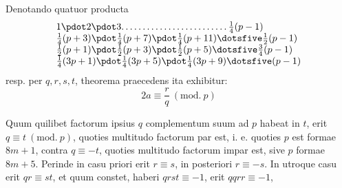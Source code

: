 Denotando quatuor producta
\[
\begin{array}{l}
1\pdot2\pdot3\mathpunct{.\,.\,.\,.\,.\,.\,.\,.\,.\,.\,.\,.\,.\,.\,.\,.\,.\,.\,.\,.\,.\,.\,.\,.\,.}\frac14(p-1)\\
\frac14(p+3)\pdot\frac14(p+7)\pdot\frac14(p+11)\dotsfive\frac12(p-1)\\
\frac12(p+1)\pdot\frac12(p+3)\pdot\frac12(p+5)\dotsfive\frac34(p-1)\\
\frac14(3p+1)\pdot\frac14(3p+5)\pdot\frac14(3p+9)\dotsfive(p-1)
\end{array}
\]
resp. per $q,r,s,t$, theorema praecedens ita exhibitur:
\[
2a\equiv\frac rq\ (\mathrm{mod.}\ p)
\]

Quum quilibet factorum ipsius $q$ complementum suum ad $p$ habeat in $t$, erit $q\equiv t\ (\mathrm{mod.}\ p)$, quoties multitudo factorum par est, i. e. quoties $p$ est formae $8m+1$, contra $q\equiv-t$, quoties multitudo factorum impar est, sive $p$ formae $8m+5$. Perinde in casu priori erit $r\equiv s$, in posteriori $r\equiv-s$. In utroque casu erit $qr\equiv st$, et quum constet, haberi $qrst\equiv-1$, erit $qqrr\equiv-1$,
